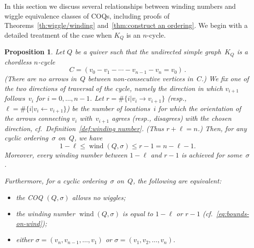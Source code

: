 \documentclass[11pt, letterpaper]{amsart}
\newtheorem{proposition}[theorem]{Proposition}
\theoremstyle{definition}
\numberwithin{equation}{section}
\def\wind{{\operatorname{wind}}}
\newcommand\GQ{K_Q}
\begin{document}
In this section we discuss several relationships between winding numbers and wiggle equivalence classes of COQs, including proofs of Theorems~\ref{th:wiggle/winding} and~\ref{thm:construct an ordering}.
We begin with a detailed treatment of the case when $\GQ$ is an $n$-cycle.

\begin{proposition}
\label{prop:n-cycle with no wiggles}
Let $Q$ be a quiver such that the undirected simple graph~$\GQ$ is a chordless $n$-cycle 
\begin{equation}
\label{eq:n-cycle-C}
C = (v_0 - v_1 - \cdots - v_{n-1} - v_n=v_0 )\,.  
\end{equation}
(There are no arrows in~$Q$ between non-consecutive vertices in~$C$.)  
We fix one of the two directions of traversal of the cycle, namely the direction in which $v_{i+1}$ follows~$v_i$ for $i=0,\dots,n-1$. 
Let $r = \# \{ i | v_i \rightarrow v_{i+1}\}$ (resp., $\ell = \# \{ i | v_i \leftarrow v_{i+1}\}$) 
be the number of locations~$i$ for which the orientation of the arrows connecting $v_i$ with~$v_{i+1}$ 
agrees (resp., disagrees) with the chosen direction, cf.\ Definition~\ref{def:winding number}. 
(Thus $r + \ell = n$.)
Then, for any cyclic ordering~$\sigma$ on~$Q$, we have 
\begin{equation}
\label{eq:bounds-on-wind}
1-\ell\le \wind(Q,\sigma)\le r-1 = n-\ell -1.   
\end{equation}
Moreover, every winding number between $1-\ell$ and $r-1$ is achieved for some~$\sigma$. 

Furthermore, for a cyclic ordering~$\sigma$ on~$Q$, the following are equivalent:
\begin{itemize}[leftmargin=.25in]
\item[{\rm (a)}]
the COQ $(Q,\sigma)$ allows no wiggles; 
\item[{\rm (b)}]
the winding number $\wind(Q,\sigma)$ is equal to $1-\ell$ or $r-1$ (cf.~\eqref{eq:bounds-on-wind}); 
\item[{\rm (c)}]
either $\sigma=(v_n, v_{n-1}, \dots, v_1)$ or $\sigma=(v_1, v_2, \dots, v_n)$. 
\end{itemize}
\end{proposition}
\end{document}
